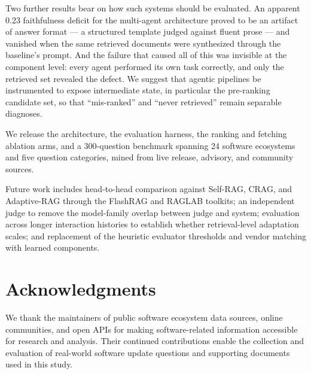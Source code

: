 \documentclass[acmsmall,review,anonymous,screen]{acmart}
\begin{document}
Two further results bear on how such systems should be evaluated. An apparent
0.23 faithfulness deficit for the multi-agent architecture proved to be an
artifact of answer format --- a structured template judged against fluent prose
--- and vanished when the same retrieved documents were synthesized through the
baseline's prompt. And the failure that caused all of this was invisible at the
component level: every agent performed its own task correctly, and only the
retrieved set revealed the defect. We suggest that agentic pipelines be
instrumented to expose intermediate state, in particular the pre-ranking
candidate set, so that ``mis-ranked'' and ``never retrieved'' remain separable
diagnoses.

We release the architecture, the evaluation harness, the ranking and fetching
ablation arms, and a 300-question benchmark spanning 24 software ecosystems and
five question categories, mined from live release, advisory, and community
sources.

Future work includes head-to-head comparison against Self-RAG, CRAG, and
Adaptive-RAG through the FlashRAG and RAGLAB toolkits; an independent judge to
remove the model-family overlap between judge and system; evaluation across
longer interaction histories to establish whether retrieval-level adaptation
scales; and replacement of the heuristic evaluator thresholds and vendor
matching with learned components.

\section*{Acknowledgments}

We thank the maintainers of public software ecosystem data sources,
online communities, and open APIs for making software-related
information accessible for research and analysis. Their continued
contributions enable the collection and evaluation of real-world
software update questions and supporting documents used in this study.



\end{document}
